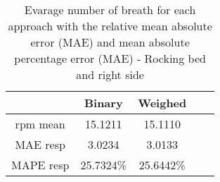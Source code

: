 
\begin{table}[h]

    \centering

\begin{tabular}{|c|c|c|c|c|}
\hline 
& Binary & Weighed \\ 
 
\hline 
rpm mean & 15.1211  & 15.1110 \\  
MAE resp   & 3.0234 &     3.0133 \\ 
MAPE resp  & 25.7324\% &  25.6442\% \\ 

\hline 
\end{tabular}
\caption{Evarage number of breath for each approach with the relative mean
absolute error (MAE) and mean absolute percentage error (MAE) - Rocking bed
and right side}
\label{tab:SupineRockingMetrics}
\end{table}